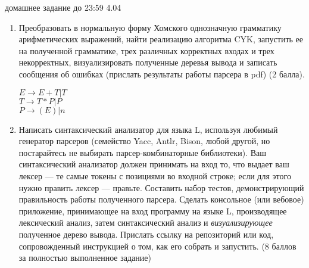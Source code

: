 \documentclass[12pt]{article}
\begin{document}

{\Large домашнее задание до 23:59 4.04}
\bigskip

\begin{enumerate}
  \item
  { Преобразовать в нормальную форму Хомского однозначную грамматику арифметических выражений, найти реализацию алгоритма CYK, запустить ее на полученной грамматике, трех различных корректных входах и трех некорректных, визуализировать полученные деревья вывода и записать сообщения об ошибках (прислать результаты работы парсера в pdf) (2 балла). 
  
    $E   {\to}   E + T | T  $ \\
    $T   {\to}   T * P | P  $ \\
    $P   {\to}   (E) | n $ \\
  }
  
  \item 
  {  Написать синтаксический анализатор для языка L, используя любимый генератор парсеров (семейство Yacc, Antlr, Bison, любой другой, но постарайтесь не выбирать парсер-комбинаторные библиотеки). Ваш синтаксический анализатор должен принимать на вход то, что выдает ваш лексер --- те самые токены с позициями во входной строке; если для этого нужно править лексер --- правьте. Составить набор тестов, демонстрирующий правильность работы полученного парсера. Сделать консольное (или вебовое) приложение, принимающее на вход программу на языке L, производящее лексический анализ, затем синтаксический анализ и \emph{визуализирующее} полученное дерево вывода. Прислать ссылку на репозиторий или код, сопровожденный инструкцией о том, как его собрать и запустить. (8 баллов за полностью выполненное задание)
  }
\end{enumerate}

\end{document}
